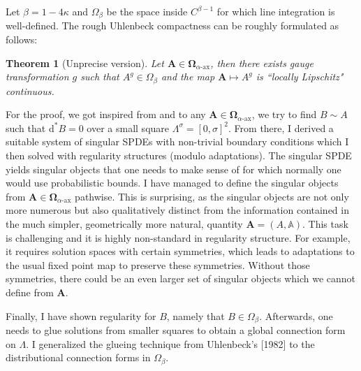 \documentclass[12pt]{article}
\numberwithin{equation}{section}
\newtheorem{theorem}{Theorem}[section]
\theoremstyle{definition}
\theoremstyle{remark}
\newcommand{\diff}{\mathrm{d}}
\newcommand{\1}{\mathbf 1}
\newcommand{\<}{\langle}
\renewcommand{\>}{\rangle}
\newcommand{\ax}{\text{-}\mathrm{ax}}
\newcommand{\bfA}{\mathbf A}
\newcommand{\bA}{\mathbb A}
\newcommand{\bfOmega}{\boldsymbol{\Omega}}
\begin{document}
Let $\beta=1-4\kappa$ and $\Omega_\beta$ be the space inside $C^{\beta-1}$ for which line integration is well-defined.  The rough Uhlenbeck compactness can be roughly formulated as follows:
\begin{theorem}[Unprecise version] Let $\bfA\in \bfOmega_{\alpha\ax}$, then there exists gauge transformation $g$ such that $A^g\in \Omega_\beta$ and the map $\bfA\mapsto A^g$ is ``locally Lipschitz" continuous.   
\end{theorem}
%
For the proof, we got inspired from \cite{Uhlenbeck82} and to any $\bfA\in\bfOmega_{\alpha\ax}$,  we try to find $B\sim A$ such that $\diff^*B=0$ over a small square $\Lambda^\sigma=[0,\sigma]^2$. From there, I derived a suitable system of singular SPDEs with non-trivial boundary conditions which I then solved with regularity structures (modulo adaptations). 
%
%
The singular SPDE yields singular objects 
that one needs to make sense of for which normally one would use probabilistic bounds. I have managed to define the singular objects from $\bfA\in\bfOmega_{\alpha\ax}$ pathwise. This is surprising, as the singular objects are not only more numerous but also qualitatively distinct from the information contained in the much simpler, geometrically more natural, quantity $\bfA=(A,\bA)$.  This task is challenging and it is highly non-standard in regularity structure. For example, it requires solution spaces with certain symmetries, which leads to adaptations to the usual fixed point map to preserve these symmetries. Without those symmetries, there could be an even larger set of singular objects which we cannot define from $\bfA$. 
%

Finally, I have shown regularity for $B$, namely that $B\in\Omega_\beta$. Afterwards, one needs to glue solutions from smaller squares to obtain a global connection form on $\Lambda$. I generalized the glueing technique from Uhlenbeck's [1982] to the distributional connection forms in $\Omega_\beta$. 
\end{document}
